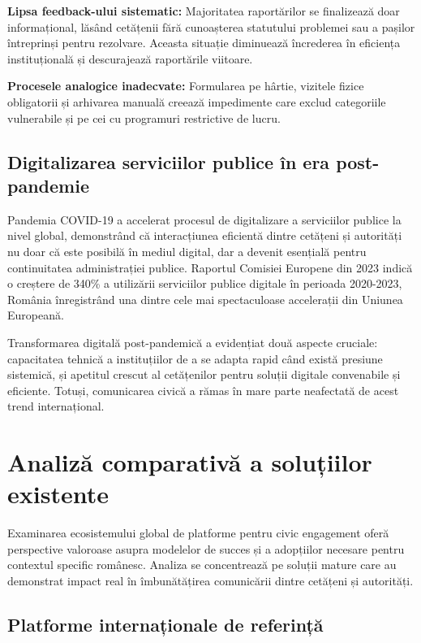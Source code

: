 \documentclass[12pt,a4paper]{report}
\begin{document}
\textbf{Lipsa feedback-ului sistematic:} Majoritatea raportărilor se finalizează doar   informațional, lăsând cetățenii fără cunoașterea statutului problemei sau a pașilor întreprinși pentru rezolvare. Aceasta situație diminuează încrederea în eficiența instituțională și descurajează raportările viitoare.

\textbf{Procesele analogice inadecvate:} Formularea pe hârtie, vizitele fizice obligatorii și arhivarea manuală creează impedimente care exclud categoriile vulnerabile și pe cei cu programuri restrictive de lucru.

\subsection{Digitalizarea serviciilor publice în era post-pandemie}

Pandemia COVID-19 a accelerat procesul de digitalizare a serviciilor publice la nivel global, demonstrând că interacțiunea eficientă dintre cetățeni și autorități nu doar că este posibilă în mediul digital, dar a devenit esențială pentru continuitatea administrației publice. Raportul Comisiei Europene din 2023 indică o creștere de 340\% a utilizării serviciilor publice digitale în perioada 2020-2023, România înregistrând una dintre cele mai spectaculoase accelerații din Uniunea Europeană.

Transformarea digitală post-pandemică a evidențiat două aspecte cruciale: capacitatea tehnică a instituțiilor de a se adapta rapid când există presiune sistemică, și apetitul crescut al cetățenilor pentru soluții digitale convenabile și eficiente. Totuși, comunicarea civică a rămas în mare parte neafectată de acest trend internațional.

\section{Analiză comparativă a soluțiilor existente}


Examinarea ecosistemului global de platforme pentru civic engagement oferă perspective valoroase asupra modelelor de succes și a adopțiilor necesare pentru contextul specific românesc. Analiza se concentrează pe soluții mature care au demonstrat impact real în îmbunătățirea comunicării dintre cetățeni și autorități.

\subsection{Platforme internaționale de referință}
\end{document}
